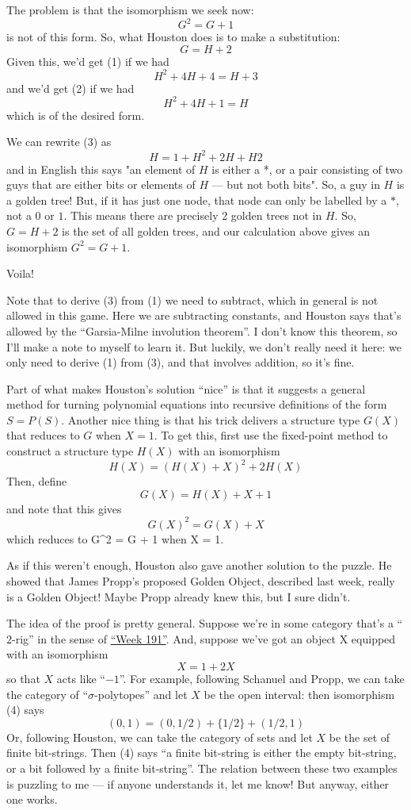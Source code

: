 \documentclass{article}
\begin{document}
The problem is that the isomorphism we seek now: \[G^2 = G + 1 \tag{1}\]
is not of this form. So, what Houston does is to make a substitution:
\[G = H + 2\] Given this, we'd get (1) if we had
\[H^2 + 4H + 4 = H + 3 \tag{2}\] and we'd get (2) if we had
\[H^2 + 4H + 1 = H \tag{3}\] which is of the desired form.

We can rewrite (3) as \[H = 1 + H^2 + 2H + H2\] and in English this says
"an element of \(H\) is either a *, or a pair consisting of two guys
that are either bits or elements of \(H\) --- but not both bits". So, a
guy in \(H\) is a golden tree! But, if it has just one node, that node
can only be labelled by a \(*\), not a \(0\) or \(1\). This means there
are precisely 2 golden trees not in \(H\). So, \(G = H + 2\) is the set
of all golden trees, and our calculation above gives an isomorphism
\(G^2 = G + 1\).

Voila!

Note that to derive (3) from (1) we need to subtract, which in general
is not allowed in this game. Here we are subtracting constants, and
Houston says that's allowed by the ``Garsia-Milne involution theorem''.
I don't know this theorem, so I'll make a note to myself to learn it.
But luckily, we don't really need it here: we only need to derive (1)
from (3), and that involves addition, so it's fine.

Part of what makes Houston's solution ``nice'' is that it suggests a
general method for turning polynomial equations into recursive
definitions of the form \(S = P(S)\). Another nice thing is that his
trick delivers a structure type \(G(X)\) that reduces to \(G\) when
\(X = 1\). To get this, first use the fixed-point method to construct a
structure type \(H(X)\) with an isomorphism
\[H(X) = (H(X) + X)^2 + 2H(X)\] Then, define \[G(X) = H(X) + X + 1\] and
note that this gives \[G(X)^2 = G(X) + X\] which reduces to G\^{}2 = G +
1 when X = 1.

As if this weren't enough, Houston also gave another solution to the
puzzle. He showed that James Propp's proposed Golden Object, described
last week, really is a Golden Object! Maybe Propp already knew this, but
I sure didn't.

The idea of the proof is pretty general. Suppose we're in some category
that's a ``\(2\)-rig'' in the sense of
\protect\hyperlink{week191}{``Week 191''}. And, suppose we've got an
object X equipped with an isomorphism \[X = 1 + 2X \tag{4}\] so that
\(X\) acts like ``\(-1\)''. For example, following Schanuel and Propp,
we can take the category of ``\(\sigma\)-polytopes'' and let \(X\) be
the open interval: then isomorphism (4) says
\[(0,1) = (0,1/2) + \{1/2\} + (1/2,1)\] Or, following Houston, we can
take the category of sets and let \(X\) be the set of finite
bit-strings. Then (4) says ``a finite bit-string is either the empty
bit-string, or a bit followed by a finite bit-string''. The relation
between these two examples is puzzling to me --- if anyone understands
it, let me know! But anyway, either one works.
\end{document}

